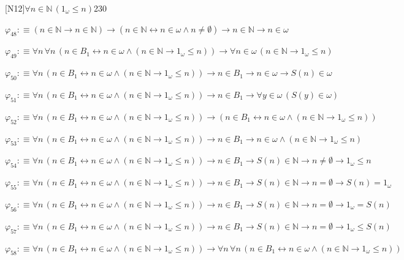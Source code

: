 \begin{fullproof}{[N12]}{$\forall n \in \mathbb{N}\,(1_{\omega} \leq n)$}{230}
\begin{abbrevlist}
\item $\varphi_{48} :\equiv (n \in \mathbb{N} \to n \in \mathbb{N}) \to (n \in \mathbb{N} \leftrightarrow n \in \omega \land n \neq \emptyset) \to n \in \mathbb{N} \to n \in \omega$
\item $\varphi_{49} :\equiv \forall n\,\forall n\,(n \in B_{1} \leftrightarrow n \in \omega \land (n \in \mathbb{N} \to 1_{\omega} \leq n)) \to \forall n \in \omega\,(n \in \mathbb{N} \to 1_{\omega} \leq n)$
\item $\varphi_{50} :\equiv \forall n\,(n \in B_{1} \leftrightarrow n \in \omega \land (n \in \mathbb{N} \to 1_{\omega} \leq n)) \to n \in B_{1} \to n \in \omega \to S(n) \in \omega$
\item $\varphi_{51} :\equiv \forall n\,(n \in B_{1} \leftrightarrow n \in \omega \land (n \in \mathbb{N} \to 1_{\omega} \leq n)) \to n \in B_{1} \to \forall y \in \omega\,(S(y) \in \omega)$
\item $\varphi_{52} :\equiv \forall n\,(n \in B_{1} \leftrightarrow n \in \omega \land (n \in \mathbb{N} \to 1_{\omega} \leq n)) \to (n \in B_{1} \leftrightarrow n \in \omega \land (n \in \mathbb{N} \to 1_{\omega} \leq n))$
\item $\varphi_{53} :\equiv \forall n\,(n \in B_{1} \leftrightarrow n \in \omega \land (n \in \mathbb{N} \to 1_{\omega} \leq n)) \to n \in B_{1} \to n \in \omega \land (n \in \mathbb{N} \to 1_{\omega} \leq n)$
\item $\varphi_{54} :\equiv \forall n\,(n \in B_{1} \leftrightarrow n \in \omega \land (n \in \mathbb{N} \to 1_{\omega} \leq n)) \to n \in B_{1} \to S(n) \in \mathbb{N} \to n \neq \emptyset \to 1_{\omega} \leq n$
\item $\varphi_{55} :\equiv \forall n\,(n \in B_{1} \leftrightarrow n \in \omega \land (n \in \mathbb{N} \to 1_{\omega} \leq n)) \to n \in B_{1} \to S(n) \in \mathbb{N} \to n = \emptyset \to S(n) = 1_{\omega}$
\item $\varphi_{56} :\equiv \forall n\,(n \in B_{1} \leftrightarrow n \in \omega \land (n \in \mathbb{N} \to 1_{\omega} \leq n)) \to n \in B_{1} \to S(n) \in \mathbb{N} \to n = \emptyset \to 1_{\omega} = S(n)$
\item $\varphi_{57} :\equiv \forall n\,(n \in B_{1} \leftrightarrow n \in \omega \land (n \in \mathbb{N} \to 1_{\omega} \leq n)) \to n \in B_{1} \to S(n) \in \mathbb{N} \to n = \emptyset \to 1_{\omega} \leq S(n)$
\item $\varphi_{58} :\equiv \forall n\,(n \in B_{1} \leftrightarrow n \in \omega \land (n \in \mathbb{N} \to 1_{\omega} \leq n)) \to \forall n\,\forall n\,(n \in B_{1} \leftrightarrow n \in \omega \land (n \in \mathbb{N} \to 1_{\omega} \leq n))$

\end{abbrevlist}
\end{fullproof}
